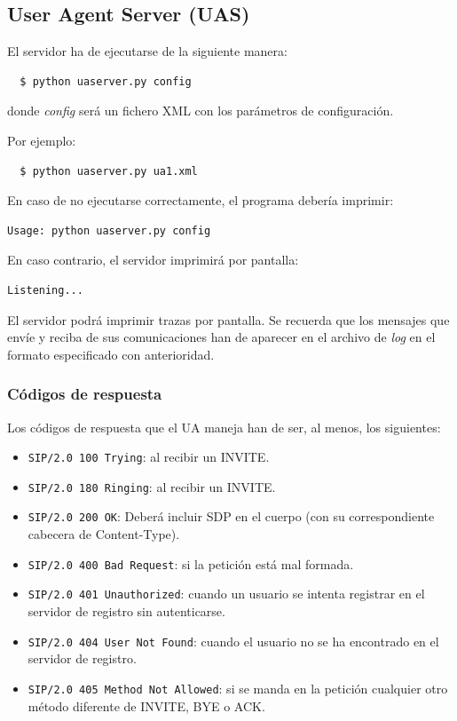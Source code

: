 \documentclass[a4paper,11pt]{article}
\begin{document}
\subsection{User Agent Server (UAS)}

El servidor ha de ejecutarse de la siguiente manera:
\begin{verbatim}
  $ python uaserver.py config
\end{verbatim}

donde \emph{config} será un fichero XML con los parámetros de configuración.

Por ejemplo:
\begin{verbatim}
  $ python uaserver.py ua1.xml
\end{verbatim}

En caso de no ejecutarse correctamente, el programa debería imprimir:
\begin{verbatim}
Usage: python uaserver.py config
\end{verbatim}

En caso contrario, el servidor imprimirá por pantalla:
\begin{verbatim}
Listening...
\end{verbatim}

El servidor podrá imprimir trazas por pantalla. Se recuerda que 
los mensajes que envíe y reciba de sus comunicaciones han de aparecer
en el archivo de \emph{log} en el formato especificado con anterioridad.

\subsubsection{Códigos de respuesta}

Los códigos de respuesta que el UA maneja han de ser, al menos, los siguientes:

   \begin{itemize}
     \item \texttt{SIP/2.0 100 Trying}: al recibir un INVITE.
     \item \texttt{SIP/2.0 180 Ringing}: al recibir un INVITE.
     \item \texttt{SIP/2.0 200 OK}: Deberá incluir SDP en el cuerpo (con su correspondiente cabecera de Content-Type).
     \item \texttt{SIP/2.0 400 Bad Request}: si la petición está mal formada.
     \item \texttt{SIP/2.0 401 Unauthorized}: cuando un usuario se intenta registrar en el servidor de registro sin autenticarse.
     \item \texttt{SIP/2.0 404 User Not Found}: cuando el usuario no se ha encontrado en el servidor de registro.
     \item \texttt{SIP/2.0 405 Method Not Allowed}: si se manda en la petición cualquier otro método diferente de INVITE, BYE o ACK.
   \end{itemize}
   
\end{document}
